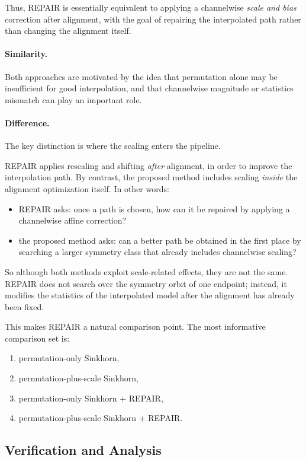 \documentclass[11pt,a4paper]{article}
\begin{document}
Thus, REPAIR is essentially equivalent to applying a channelwise \emph{scale and bias} correction after alignment, with the goal of repairing the interpolated path rather than changing the alignment itself.

\paragraph{Similarity.}
Both approaches are motivated by the idea that permutation alone may be insufficient for good interpolation, and that channelwise magnitude or statistics mismatch can play an important role.

\paragraph{Difference.}
The key distinction is where the scaling enters the pipeline.

REPAIR applies rescaling and shifting \emph{after} alignment, in order to improve the interpolation path. By contrast, the proposed method includes scaling \emph{inside} the alignment optimization itself. In other words:
\begin{itemize}
    \item REPAIR asks: once a path is chosen, how can it be repaired by applying a channelwise affine correction?
    \item the proposed method asks: can a better path be obtained in the first place by searching a larger symmetry class that already includes channelwise scaling?
\end{itemize}

So although both methods exploit scale-related effects, they are not the same. REPAIR does not search over the symmetry orbit of one endpoint; instead, it modifies the statistics of the interpolated model after the alignment has already been fixed.

This makes REPAIR a natural comparison point. The most informative comparison set is:
\begin{enumerate}
    \item permutation-only Sinkhorn,
    \item permutation-plus-scale Sinkhorn,
    \item permutation-only Sinkhorn + REPAIR,
    \item permutation-plus-scale Sinkhorn + REPAIR.
\end{enumerate}

\subsection{Verification and Analysis}
\end{document}
